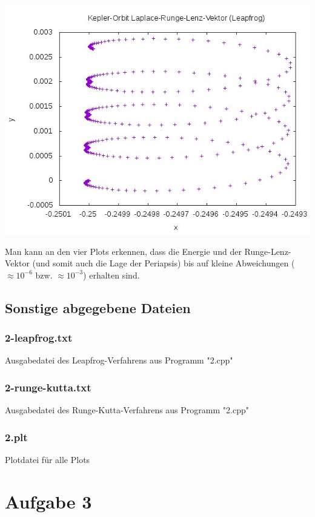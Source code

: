 \documentclass{scrreprt}
\begin{document}
\begin{center}
	\includegraphics*[scale=0.7]{2_leapfrog_lrl.jpeg}
\end{center}

Man kann an den vier Plots erkennen, dass die Energie und der Runge-Lenz-Vektor (und somit auch die Lage der Periapsis) bis auf kleine Abweichungen ($\approx 10^{-6}$ bzw. $\approx 10^{-3}$) erhalten sind. 

\section*{Sonstige abgegebene Dateien}
\subsection*{2-leapfrog.txt}
Ausgabedatei des Leapfrog-Verfahrens aus Programm "2.cpp"
\subsection*{2-runge-kutta.txt}
Ausgabedatei des Runge-Kutta-Verfahrens aus Programm "2.cpp"
\subsection*{2.plt}
Plotdatei für alle Plots

\chapter*{Aufgabe 3}
\end{document}
